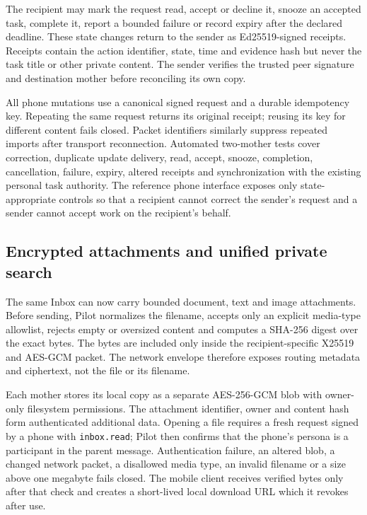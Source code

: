 The recipient may mark the request read, accept or decline it, snooze an accepted task, complete
it, report a bounded failure or record expiry after the declared deadline.  These state changes
return to the sender as Ed25519-signed receipts.  Receipts contain the action identifier, state,
time and evidence hash but never the task title or other private content.  The sender verifies the
trusted peer signature and destination mother before reconciling its own copy.

All phone mutations use a canonical signed request and a durable idempotency key.  Repeating the
same request returns its original receipt; reusing its key for different content fails closed.
Packet identifiers similarly suppress repeated imports after transport reconnection.  Automated
two-mother tests cover correction, duplicate update delivery, read, accept, snooze, completion,
cancellation, failure, expiry, altered receipts and synchronization with the existing personal
task authority.  The reference phone interface exposes only state-appropriate controls so that a
recipient cannot correct the sender's request and a sender cannot accept work on the recipient's
behalf.

\subsection{Encrypted attachments and unified private search}

The same Inbox can now carry bounded document, text and image attachments.  Before sending, Pilot
normalizes the filename, accepts only an explicit media-type allowlist, rejects empty or oversized
content and computes a SHA-256 digest over the exact bytes.  The bytes are included only inside
the recipient-specific X25519 and AES-GCM packet.  The network envelope therefore exposes routing
metadata and ciphertext, not the file or its filename.

Each mother stores its local copy as a separate AES-256-GCM blob with owner-only filesystem
permissions.  The attachment identifier, owner and content hash form authenticated additional
data.  Opening a file requires a fresh request signed by a phone with \texttt{inbox.read}; Pilot
then confirms that the phone's persona is a participant in the parent message.  Authentication
failure, an altered blob, a changed network packet, a disallowed media type, an invalid filename
or a size above one megabyte fails closed.  The mobile client receives verified bytes only after
that check and creates a short-lived local download URL which it revokes after use.

